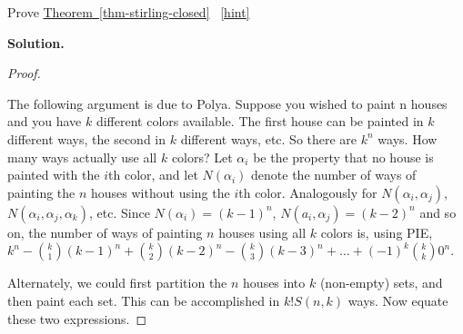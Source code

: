 \documentclass{book}
\begin{document}
\setcounter{project}{285}
\addtocounter{project}{-1}
\begin{activity}[]\label{activity-278}
\hypertarget{p-1508}{}%
Prove \hyperref[thm-stirling-closed]{Theorem~\ref{thm-stirling-closed}}%
~\hfill{\tiny\hyperlink{a-285}{[hint]}\hypertarget{q-285}{}}\par\smallskip%
\noindent\textbf{Solution.}\hypertarget{solution-223}{}\quad%
\begin{proof}\hypertarget{proof-7}{}
\hypertarget{p-1510}{}%
The following argument is due to Polya. Suppose you wished to paint n houses and you have \(k\) different colors available. The first house can be painted in \(k\) different ways, the second in \(k\) different ways, etc. So there are \(k^{n}\) ways. How many ways actually use all \(k\) colors? Let \(\alpha_{i}\) be the property that no house is painted with the \(i\)th color, and let \(N(\alpha_{i})\) denote the number of ways of painting the \(n\) houses without using the \(i\)th color. Analogously for \(N(\alpha_{i},\alpha_{j})\), \(N(\alpha_{i},\alpha_{j},\alpha_{k})\), etc. Since \(N(\alpha_{i}) = (k - 1)^{n}\), \(N(a_{i},\alpha_{j}) = ( k - 2)^{n}\) and so on, the number of ways of painting \(n\) houses using all \(k\) colors is, using PIE, \(k^{n} -\binom{k}{1} \left(k - 1 \right)^{n} + \binom{k}{2} \left( k - 2 \right)^{n} - \binom{k}{3}      \left( k - 3 \right)^{n} + \ldots + \left( - 1 \right)^{k}\binom{k}{k} 0^{n}\).%
\par
\hypertarget{p-1511}{}%
Alternately, we could first partition the \(n\) houses into \(k\) (non-empty) sets, and then paint each set. This can be    accomplished in \(k!S(n,k)\) ways. Now equate these two expressions.%
\end{proof}
\end{activity}
\end{document}
